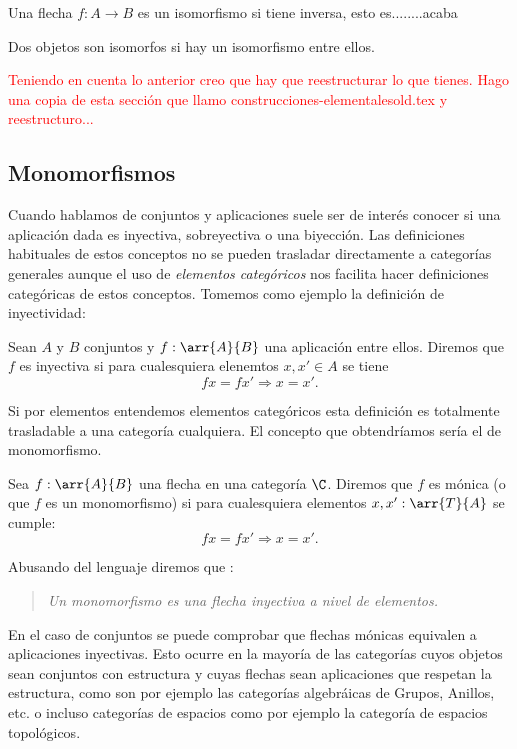 \begin{definition*}
	Una flecha $f:A\rightarrow B$ es un isomorfismo si tiene inversa, esto es........acaba

	Dos objetos son isomorfos si hay un isomorfismo entre ellos.
\end{definition*}
\textcolor{red}{Teniendo en cuenta lo anterior creo que hay que reestructurar lo que tienes. Hago una copia de esta sección que llamo construcciones-elementalesold.tex y reestructuro...}

\subsection{Monomorfismos}
Cuando hablamos de conjuntos y aplicaciones suele ser de interés conocer si una aplicación dada es inyectiva,
sobreyectiva o una biyección. Las definiciones
habituales de estos conceptos no se pueden trasladar directamente
a categorías generales aunque el uso de \emph{elementos categóricos} nos facilita hacer definiciones categóricas de estos conceptos. Tomemos como ejemplo la definición de inyectividad:

\begin{definition*}
Sean $A$ y $B$ conjuntos y $f : \arr{A}{B}$ una aplicación entre ellos.
Diremos que $f$ es inyectiva si para cualesquiera elenemtos $x, x' \in A$ se tiene
$$
fx = fx'\Rightarrow x = x'.
$$
\end{definition*}

Si por elementos entendemos elementos categóricos esta definición es totalmente trasladable a una categoría cualquiera. El concepto que obtendríamos sería el de monomorfismo.


\begin{definition*}
Sea $f : \arr{A}{B}$ una flecha en una categoría $\C$.
Diremos que $f$ es mónica (o que $f$ es un monomorfismo) si para cualesquiera elementos $x,x':\arr{T}{A}$ se cumple:
$$
fx = fx'\Rightarrow x = x'.
$$
\end{definition*}

Abusando del lenguaje diremos que :
\begin{quote}
	\emph{Un monomorfismo es una flecha inyectiva a nivel de elementos.}
\end{quote}


En el caso de conjuntos se puede comprobar que flechas mónicas equivalen a aplicaciones inyectivas.
Esto ocurre en la mayoría de las categorías cuyos objetos sean conjuntos con estructura y cuyas flechas sean aplicaciones que respetan la estructura, como son por ejemplo las categorías algebráicas de Grupos, Anillos, etc. o incluso categorías de espacios como por ejemplo la categoría de espacios topológicos.

